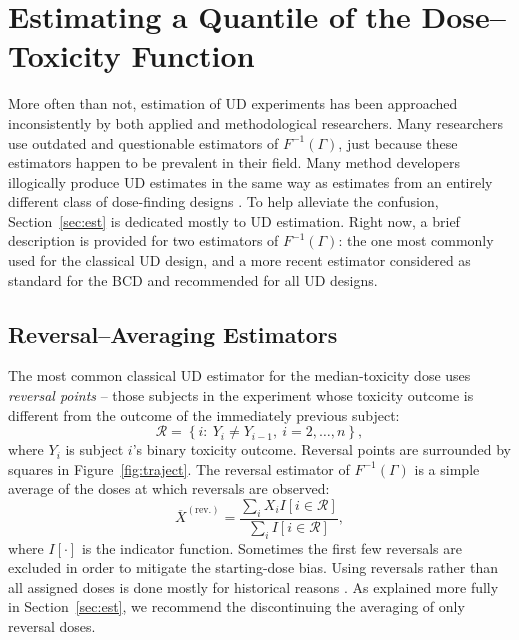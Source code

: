 \section{Estimating a Quantile of the Dose--Toxicity Function}

More often than not, estimation of UD experiments has been approached inconsistently by both applied and methodological researchers. Many researchers use outdated and questionable estimators of $F^{-1}(\Gamma)$, just because these estimators happen to be prevalent in their field. Many method developers illogically produce  UD estimates  in the same way as estimates from an entirely different class of dose-finding designs \cite[e.g.,][]{Zack:stag:2009}. To help alleviate the confusion, Section~\ref{sec:est} is dedicated mostly to UD estimation. Right now, a brief description is provided for two  estimators of $F^{-1}(\Gamma)$: the one most commonly used for the classical UD design, and a more recent estimator considered as standard for the BCD and recommended for all UD designs.

\subsection{Reversal--Averaging Estimators}

The most common classical UD estimator for the median-toxicity dose uses \emph{reversal points} -- those subjects in the experiment whose toxicity outcome is different from the outcome of the immediately previous subject:
%
\begin{equation}\label{eq:reversal}
\mathcal{R}=\left\{i:\ Y_i\neq Y_{i-1},\ i=2,\ldots ,n\right\},
\end{equation}
where $Y_i$ is subject $i$'s binary toxicity outcome. Reversal points are surrounded by squares in Figure~\ref{fig:traject}. The reversal estimator of $F^{-1}(\Gamma)$ is a simple average of the doses at which reversals are observed:
\begin{equation}\label{eq:reversav}
\overline{X}^{\mathrm{(rev.)}}=\frac{\sum_iX_iI\left[i\in\mathcal{R}\right]}{\sum_iI\left[i\in\mathcal{R}\right]},
\end{equation}
\noindent where $I[\cdot]$ is the indicator function. Sometimes the first few reversals are excluded in order to mitigate the starting-dose bias. Using reversals rather than all assigned doses is done mostly for historical reasons \citep{Weth:Chen:Vasu:est:1966}. As explained more fully in Section~\ref{sec:est}, we recommend the discontinuing  the averaging of only reversal doses.

